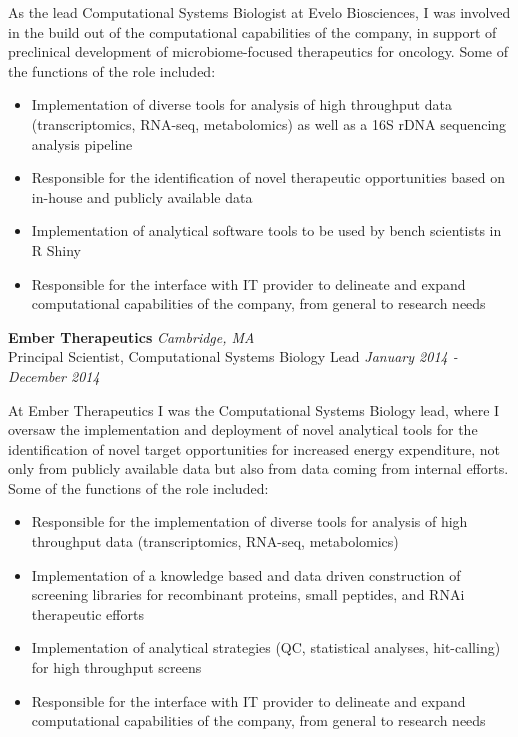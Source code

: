 \documentclass[11pt,a4paper,]{awesome-cv}
\providecommand{\tightlist}{%
	\setlength{\itemsep}{0pt}\setlength{\parskip}{0pt}}
\begin{document}
As the lead Computational Systems Biologist at Evelo Biosciences, I was
involved in the build out of the computational capabilities of the
company, in support of preclinical development of microbiome-focused
therapeutics for oncology. Some of the functions of the role included:

\begin{itemize}
\tightlist
\item
  Implementation of diverse tools for analysis of high throughput data
  (transcriptomics, RNA-seq, metabolomics) as well as a 16S rDNA
  sequencing analysis pipeline
\item
  Responsible for the identification of novel therapeutic opportunities
  based on in-house and publicly available data
\item
  Implementation of analytical software tools to be used by bench
  scientists in R Shiny
\item
  Responsible for the interface with IT provider to delineate and expand
  computational capabilities of the company, from general to research
  needs
\end{itemize}

\textbf{{Ember Therapeutics}} \hfill \emph{Cambridge, MA}\\
Principal Scientist, Computational Systems Biology Lead
\hfill \emph{January 2014 - December 2014}

At Ember Therapeutics I was the Computational Systems Biology lead,
where I oversaw the implementation and deployment of novel analytical
tools for the identification of novel target opportunities for increased
energy expenditure, not only from publicly available data but also from
data coming from internal efforts. Some of the functions of the role
included:

\begin{itemize}
\tightlist
\item
  Responsible for the implementation of diverse tools for analysis of
  high throughput data (transcriptomics, RNA-seq, metabolomics)
\item
  Implementation of a knowledge based and data driven construction of
  screening libraries for recombinant proteins, small peptides, and RNAi
  therapeutic efforts
\item
  Implementation of analytical strategies (QC, statistical analyses,
  hit-calling) for high throughput screens
\item
  Responsible for the interface with IT provider to delineate and expand
  computational capabilities of the company, from general to research
  needs
\end{itemize}
\end{document}

